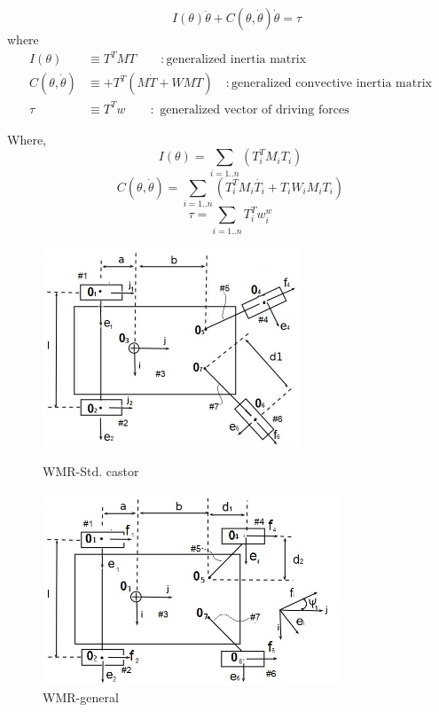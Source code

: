 \begin{equation}
\label{CE}
 \quad I(\theta)\ddot{\theta}+C(\theta,\dot{\theta})\dot{\theta}=\tau
\end{equation}
where
\begin{align*}
I(\theta) &\equiv T^TMT\quad \quad:\text{generalized inertia matrix}\\
C(\theta,\dot{\theta})&\equiv +T^T(M\dot{T}+WMT) \quad :\text{generalized  convective inertia matrix}\\
\tau&\equiv T^Tw \quad \quad :\text{ generalized vector of driving forces }
\end{align*}

Where, 
\begin{equation}
	I(\theta)=\sum_{i=1..n}(T_i^TM_iT_i)
\end{equation}
\begin{equation}
C(\theta,\dot{\theta})=\sum_{i=1..n}(T_i^T M_i\dot{T_i}+T_i W_i M_i T_i)
\end{equation}
\begin{equation}
\tau=\sum_{i=1..n}T_i^T w^w_i
\end{equation}

\begin{figure}
	\begin{minipage}[t]{0.5\textwidth}
	\centering
		\includegraphics[width=3in]{Chapter4/fig/fig1.jpg} 
		\caption{WMR-Std. castor}\label{fig:std}
	\end{minipage}
	\hfill
	\begin{minipage}[t]{0.5\textwidth}
	\centering
		\includegraphics[width=3.5in]{Chapter4/fig/fig2.jpg} 
		\caption{WMR-general}\label{fig:gen}
			\end{minipage}
\end{figure}


